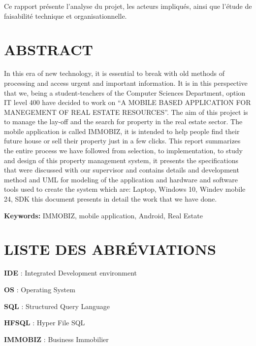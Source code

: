 \documentclass[english,12pt,a4paper]{report}
\begin{document}
\begin{spacing}{1.5}
Ce rapport présente l’analyse du projet, les acteurs impliqués, ainsi que l’étude de faisabilité technique et organisationnelle.
\bigskip 
\bigskip
\par 

\chapter*{ABSTRACT}
\hspace{1.2cm}
In this era of new technology, it is essential to break with old methods of processing and access urgent and important information. It is in this perspective that we, being a student-teachers of the Computer Sciences Department, option IT level 400 have decided to work on “A MOBILE BASED APPLICATION FOR MANEGEMENT OF REAL ESTATE RESOURCES”. The aim of this project is to manage the lay-off and the search for property in the real estate sector. The mobile application is called IMMOBIZ, it is intended to help people find their future house or sell their property just in a few clicks. This report summarizes the entire process we have followed from selection, to implementation, to study and design of this property management system, it presents the specifications that were discussed with our supervisor and contains details and development method and UML for modeling of the application and hardware and software tools used to create the system which are: Laptop, Windows 10, Windev mobile 24, SDK this document presents in detail the work that we have done. 

\bigskip 
\bigskip
\par 

\textbf{Keywords:} IMMOBIZ, mobile application, Android, Real Estate 
\chapter*{LISTE DES ABRÉVIATIONS}
\textbf{IDE} : Integrated Development environment 

\textbf{OS} : 	 Operating System 

\textbf{SQL} :  	Structured Query Language

\textbf{HFSQL} : Hyper File SQL

\textbf{IMMOBIZ} : Business Immobilier 
\end{spacing}

\tableofcontents
\end{document}
